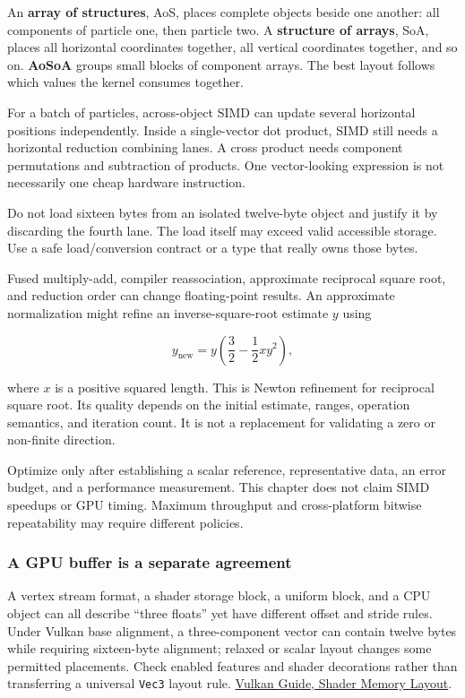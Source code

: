 An \textbf{array of structures}, AoS, places complete objects beside one another: all components of particle one, then particle two. A \textbf{structure of arrays}, SoA, places all horizontal coordinates together, all vertical coordinates together, and so on. \textbf{AoSoA} groups small blocks of component arrays. The best layout follows which values the kernel consumes together.

For a batch of particles, across-object SIMD can update several horizontal positions independently. Inside a single-vector dot product, SIMD still needs a horizontal reduction combining lanes. A cross product needs component permutations and subtraction of products. One vector-looking expression is not necessarily one cheap hardware instruction.

Do not load sixteen bytes from an isolated twelve-byte object and justify it by discarding the fourth lane. The load itself may exceed valid accessible storage. Use a safe load/conversion contract or a type that really owns those bytes.

Fused multiply-add, compiler reassociation, approximate reciprocal square root, and reduction order can change floating-point results. An approximate normalization might refine an inverse-square-root estimate \(y\) using

\[
y_{\mathrm{new}}=y\left(\frac32-\frac12xy^2\right),
\]

where \(x\) is a positive squared length. This is Newton refinement for reciprocal square root. Its quality depends on the initial estimate, ranges, operation semantics, and iteration count. It is not a replacement for validating a zero or non-finite direction.

Optimize only after establishing a scalar reference, representative data, an error budget, and a performance measurement. This chapter does not claim SIMD speedups or GPU timing. Maximum throughput and cross-platform bitwise repeatability may require different policies.

\subsubsection{A GPU buffer is a separate agreement}\label{a-gpu-buffer-is-a-separate-agreement}

A vertex stream format, a shader storage block, a uniform block, and a CPU object can all describe ``three floats'' yet have different offset and stride rules. Under Vulkan base alignment, a three-component vector can contain twelve bytes while requiring sixteen-byte alignment; relaxed or scalar layout changes some permitted placements. Check enabled features and shader decorations rather than transferring a universal \texttt{Vec3} layout rule. \href{https://docs.vulkan.org/guide/latest/shader_memory_layout.html}{Vulkan Guide, Shader Memory Layout}.

